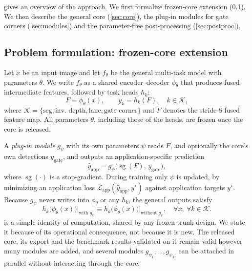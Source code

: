 \documentclass[10pt,twocolumn,letterpaper]{article}
\begin{document}
 gives an overview of the approach. We first formalize frozen-core extension (\cref{sec:formulation}). We then describe the general core (\cref{sec:core}), the plug-in modules for gate corners (\cref{sec:modules}) and the parameter-free post-processing (\cref{sec:postproc}).

\subsection{Problem formulation: frozen-core extension}
\label{sec:formulation}
Let $x$ be an input image and let $f_\theta$ be the general multi-task model with parameters $\theta$. We write $f_\theta$ as a shared encoder--decoder $\phi_\theta$ that produces fused intermediate features, followed by task heads $h_k$:
\begin{equation}
  F = \phi_\theta(x), \qquad y_k = h_k(F), \quad k \in \mathcal{K},
  \label{eq:core}
\end{equation}
where $\mathcal{K} = \{\text{seg}, \text{inv.\ depth}, \text{lane}, \text{gate corner}\}$ and $F$ denotes the stride-8 fused feature map. All parameters $\theta$, including those of the heads, are frozen once the core is released.

A \emph{plug-in module} $g_\psi$ with its own parameters $\psi$ reads $F$, and optionally the core's own detections $y_{\text{gate}}$, and outputs an application-specific prediction
\begin{equation}
  \hat{y}_{\text{app}} = g_\psi\big(\operatorname{sg}(F),\, y_{\text{gate}}\big),
  \label{eq:module}
\end{equation}
where $\operatorname{sg}(\cdot)$ is a stop-gradient. During training only $\psi$ is updated, by minimizing an application loss $\mathcal{L}_{\text{app}}(\hat{y}_{\text{app}}, y^\star)$ against application targets $y^\star$. Because $g_\psi$ never writes into $\phi_\theta$ or any $h_k$, the general outputs satisfy
\begin{equation}
  h_k\big(\phi_\theta(x)\big)\big|_{\text{with } g_\psi} \equiv h_k\big(\phi_\theta(x)\big)\big|_{\text{without } g_\psi}, \quad \forall x,\ \forall k \in \mathcal{K}.
  \label{eq:nonregression}
\end{equation}
 is a simple identity of computation, shared by any frozen-trunk design. We state it because of its operational consequence, not because it is new. The released core, its export and the benchmark results validated on it remain valid however many modules are added, and several modules $g_{\psi_1},\dots,g_{\psi_M}$ can be attached in parallel without interacting through the core.
\end{document}
